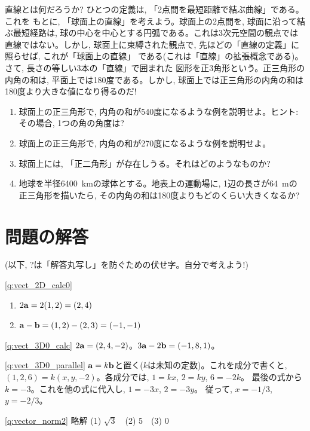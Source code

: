 \begin{exq}\label{exq:vector_sphere_trigonometry}
直線とは何だろうか? ひとつの定義は, 「2点間を最短距離で結ぶ曲線」である。これを
もとに, 「球面上の直線」を考えよう。球面上の2点間を, 球面に沿って結ぶ最短経路は, 
球の中心を中心とする円弧である。これは3次元空間の観点では直線ではない。しかし, 
球面上に束縛された観点で, 先ほどの「直線の定義」に照らせば, これが「球面上の直線」
である(これは「直線」の拡張概念である)。さて, 長さの等しい3本の「直線」で囲まれた
図形を正3角形という。正三角形の内角の和は, 平面上では180度である。しかし, 
球面上では正三角形の内角の和は180度より大きな値になり得るのだ!
\begin{enumerate}
\item 球面上の正三角形で, 内角の和が540度になるような例を説明せよ。ヒント: その場合, 1つの角の角度は?
\item 球面上の正三角形で, 内角の和が270度になるような例を説明せよ。
\item 球面上には, 「正二角形」が存在しうる。それはどのようなものか?
\item 地球を半径6400~kmの球体とする。地表上の運動場に, 1辺の長さが64~mの
正三角形を描いたら, その内角の和は180度よりもどのくらい大きくなるか?
\end{enumerate}
\end{exq}
\hv



\section*{問題の解答}
(以下, ?は「解答丸写し」を防ぐための伏せ字。自分で考えよう!) 

\ref{q:vect_2D_calc0}  \
\begin{enumerate}
\item $2{\bf a}=2(1,2)=(2,4)$
\item ${\bf a}-{\bf b}=(1,2)-(2,3)=(-1,-1)$
\end{enumerate}
\hv

%
\ref{q:vect_3D0_calc} 
$2{\bf a}=(2, 4, -2)$。$3{\bf a}-2{\bf b}=(-1, 8, 1)$。

%
\ref{q:vect_3D0_parallel} 
${\bf a}=k{\bf b}$と置く($k$は未知の定数)。これを成分で書くと, 
$(1, 2, 6)=k(x, y, -2)$。各成分では, $1=kx$, $2=ky$, $6=-2k$。
最後の式から$k=-3$。これを他の式に代入し, $1=-3x$, $2=-3y$。
従って, $x=-1/3$, $y=-2/3$。\hv

%
\ref{q:vector_norm2} 略解
(1) $\sqrt{3}$　(2) 5　(3) 0\hv

